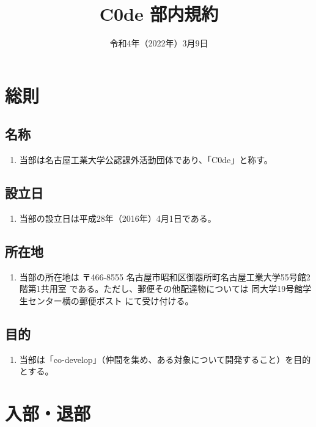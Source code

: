 \documentclass[12pt, unicode, a4paper]{ltjsreport}
\title{C0de 部内規約}
\date{令和4年（2022年）3月9日}
\begin{document}
\maketitle

\tableofcontents

\chapter{総則}
    \section{名称}
        \begin{enumerate}
            \item 当部は名古屋工業大学公認課外活動団体であり、「C0de」と称す。
        \end{enumerate}

    \section{設立日}
        \begin{enumerate}
            \item 当部の設立日は平成28年（2016年）4月1日である。
        \end{enumerate}

    \section{所在地}
        \begin{enumerate}
            \item 当部の所在地は 〒466-8555 名古屋市昭和区御器所町名古屋工業大学55号館2階第1共用室 である。ただし、郵便その他配達物については 同大学19号館学生センター横の郵便ポスト にて受け付ける。
        \end{enumerate}

    \section{目的}\label{purpose}
        \begin{enumerate}
            \item 当部は「co-develop」（仲間を集め、ある対象について開発すること）を目的とする。
        \end{enumerate}


\chapter{入部・退部}
\end{document}
